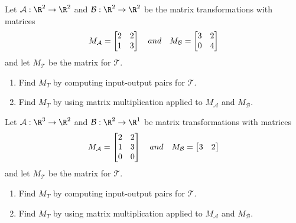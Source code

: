 \begin{exercises}
\begin{problist}
		\prob Let $\mathcal A: \R^2 \to \R^2$ and $\mathcal B: \R^2 \to \R^2$ be the matrix transformations with matrices
		\[
		    M_{\mathcal A} = \mat{2&2\\1&3} \quad and \quad M_{\mathcal B} = \mat{3&2\\0&4}
		\]
		and let $M_{\mathcal T}$ be the matrix for $\mathcal T$.
		\begin{enumerate}
		    \item Find $M_T$ by computing input-output pairs for $\mathcal T$.
		    \item Find $M_T$ by using matrix multiplication applied to $M_{\mathcal A}$ and $M_{\mathcal B}$. 
		\end{enumerate}
		
		\prob Let $\mathcal A: \R^3 \to \R^2$ and $\mathcal B: \R^2 \to \R^1$ be matrix transformations with matrices
		\[
		    M_{\mathcal A} = \mat{2&2\\1&3\\0&0} \quad and \quad M_{\mathcal B} = \mat{3&2}
		\]
	    and let $M_{\mathcal T}$ be the matrix for $\mathcal T$.		\begin{enumerate}
		    \item Find $M_T$ by computing input-output pairs for $\mathcal T$.
		    \item Find $M_T$ by using matrix multiplication applied to $M_{\mathcal A}$ and $M_{\mathcal B}$. 
		\end{enumerate}
		\end{problist}
\end{exercises}
